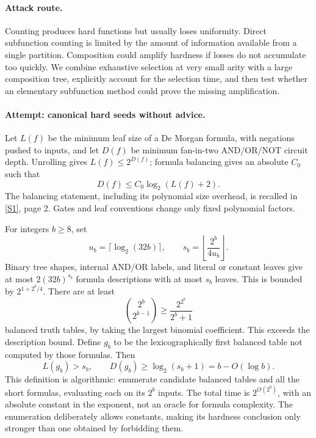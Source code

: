 \documentclass[11pt,a4paper]{article}
\newcommand{\sref}[2]{\hyperlink{source:#1:#2}{[S#2]}}
\numberwithin{equation}{section}
\begin{document}
\paragraph{Attack route.}
Counting produces hard functions but usually loses uniformity. Direct subfunction counting is limited by the amount of information available from a single partition. Composition could amplify hardness if losses do not accumulate too quickly. We combine exhaustive selection at very small arity with a large composition tree, explicitly account for the selection time, and then test whether an elementary subfunction method could prove the missing amplification.

\paragraph{Attempt: canonical hard seeds without advice.}
Let $L(f)$ be the minimum leaf size of a De Morgan formula, with negations pushed to inputs, and let $D(f)$ be minimum fan-in-two AND/OR/NOT circuit depth. Unrolling gives $L(f)\le2^{D(f)}$; formula balancing gives an absolute $C_0$ such that
\begin{equation}\label{r69:balance}
 D(f)\le C_0\log_2(L(f)+2).
\end{equation}
The balancing statement, including its polynomial size overhead, is recalled in \sref{statement}{1}, page 2. Gates and leaf conventions change only fixed polynomial factors.

For integers $b\ge8$, set
\[
 u_b=\lceil\log_2(32b)\rceil,\qquad
 s_b=\left\lfloor\frac{2^b}{4u_b}\right\rfloor.
\]
Binary tree shapes, internal AND/OR labels, and literal or constant leaves give at most $2(32b)^{s_b}$ formula descriptions with at most $s_b$ leaves. This is bounded by $2^{1+2^b/4}$. There are at least
\[
 \binom{2^b}{2^{b-1}}\ge\frac{2^{2^b}}{2^b+1}
\]
balanced truth tables, by taking the largest binomial coefficient. This exceeds the description bound. Define $g_b$ to be the lexicographically first balanced table not computed by those formulas. Then
\begin{equation}\label{r69:seed}
 L(g_b)>s_b,\qquad D(g_b)\ge\log_2(s_b+1)=b-O(\log b).
\end{equation}
This definition is algorithmic: enumerate candidate balanced tables and all the short formulas, evaluating each on its $2^b$ inputs. The total time is $2^{O(2^b)}$, with an absolute constant in the exponent, not an oracle for formula complexity. The enumeration deliberately allows constants, making its hardness conclusion only stronger than one obtained by forbidding them.
\end{document}
